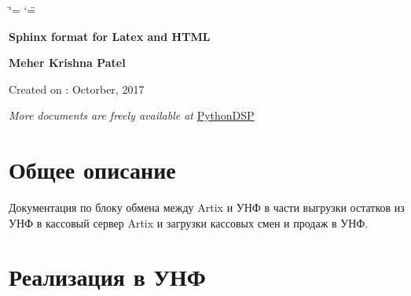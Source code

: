 \documentclass[twoside,11pt,a4paper,notitlepage]{report}
\date{\displaydate{date}}
\begin{document}
\ifdefined\shorthandoff
  \ifnum\catcode`\=\string=\active\shorthandoff{=}\fi
  \ifnum\catcode`\"=\active{}\fi
\fi

\pagestyle{empty}


        \begin{titlepage}
            \centering

            \vspace*{40mm} %
            \textbf{\Huge {Sphinx format for Latex and HTML}}

            \vspace{0mm}

            \vspace{0mm}
            \Large \textbf{{Meher Krishna Patel}}

            \small Created on : Octorber, 2017

            \vspace*{0mm}



            \vfill
            \small \textit{More documents are freely available at }{\href{http://pythondsp.readthedocs.io/en/latest/pythondsp/toc.html}{PythonDSP}}
        \end{titlepage}

        \clearpage
        \tableofcontents
        \listoffigures
        \listoftables
        \clearpage

        
\pagestyle{plain}
 

\label{\detokenize{index::doc}}





\chapter{Общее описание}
\label{\detokenize{description:id1}}\label{\detokenize{description::doc}}

Документация по блоку обмена между Artix и УНФ в части выгрузки остатков из УНФ в кассовый сервер Artix и загрузки кассовых смен и продаж в УНФ.




\chapter{Реализация в УНФ}
\label{\detokenize{unf:id1}}\label{\detokenize{unf::doc}}
\end{document}
